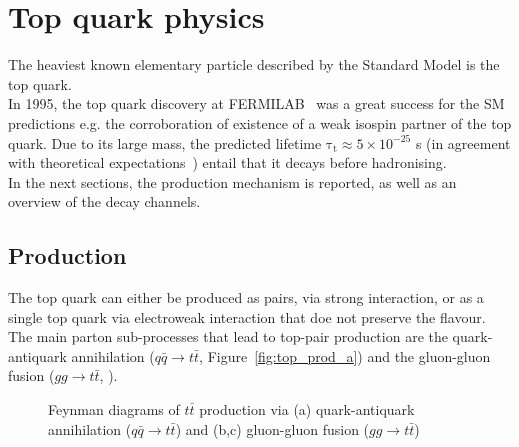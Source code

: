 \section{Top quark physics}
The heaviest known elementary particle described by the Standard Model is the top quark.\\
In 1995, the top quark discovery at FERMILAB~\cite{CDF,D0} was a great success for the SM predictions e.g. the corroboration of existence  of a weak isospin partner of the top quark.
Due to its large mass, the predicted lifetime $\mathrm{\tau_{t} \approx 5\times 10^{−25}}$ s (in agreement with theoretical expectations~\cite{LHcb_top}) entail that it decays before hadronising.\\
In the next sections, the production mechanism is reported, as well as an overview of the decay channels.
\subsection{Production}
The top quark can either be produced as pairs, via strong interaction, or as a single top quark via electroweak interaction that doe not preserve the flavour.\\
The main parton sub-processes that lead to top-pair production are the quark-antiquark annihilation ($q\bar{q}\rightarrow t\bar{t}$, Figure~\ref{fig:top_prod_a}) and the gluon-gluon fusion ($gg\rightarrow t\bar{t}$, ).\\
\begin{figure}[h]
	\centering
	\quad
	\quad
	\caption{Feynman diagrams of $t\bar{t}$ production via (a) quark-antiquark annihilation ($q\bar{q}\rightarrow t\bar{t}$) and (b,c) gluon-gluon fusion ($gg\rightarrow t\bar{t}$) }
\end{figure}
